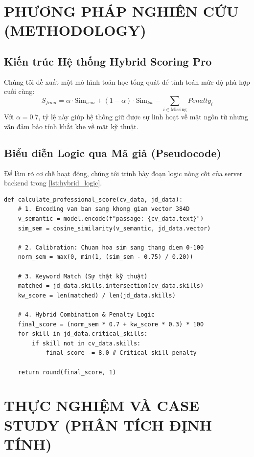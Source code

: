 \documentclass[12pt,a4paper,oneside]{report}
\begin{document}
\chapter{PHƯƠNG PHÁP NGHIÊN CỨU (METHODOLOGY)}
\label{ch:methods}

\section{Kiến trúc Hệ thống Hybrid Scoring Pro}
Chúng tôi đề xuất một mô hình toán học tổng quát để tính toán mức độ phù hợp cuối cùng:
\begin{equation}
    S_{final} = \alpha \cdot \text{Sim}_{sem} + (1-\alpha) \cdot \text{Sim}_{kw} - \sum_{i \in \text{Missing}} Penalty_i
\end{equation}
Với $\alpha=0.7$, tỷ lệ này giúp hệ thống giữ được sự linh hoạt về mặt ngôn từ nhưng vẫn đảm bảo tính khắt khe về mặt kỹ thuật.

\section{Biểu diễn Logic qua Mã giả (Pseudocode)}
Để làm rõ cơ chế hoạt động, chúng tôi trình bày đoạn logic nòng cốt của server backend trong \cref{lst:hybrid_logic}.

\begin{lstlisting}[caption={Thuật toán Hybrid Scoring thực thi trong MatchAI Pro}, label={lst:hybrid_logic}]
def calculate_professional_score(cv_data, jd_data):
    # 1. Encoding van ban sang khong gian vector 384D
    v_semantic = model.encode(f"passage: {cv_data.text}")
    sim_sem = cosine_similarity(v_semantic, jd_data.vector)
    
    # 2. Calibration: Chuan hoa sim sang thang diem 0-100
    norm_sem = max(0, min(1, (sim_sem - 0.75) / 0.20))
    
    # 3. Keyword Match (Sự thật kỹ thuật)
    matched = jd_data.skills.intersection(cv_data.skills)
    kw_score = len(matched) / len(jd_data.skills)
    
    # 4. Hybrid Combination & Penalty Logic
    final_score = (norm_sem * 0.7 + kw_score * 0.3) * 100
    for skill in jd_data.critical_skills:
        if skill not in cv_data.skills:
            final_score -= 8.0 # Critical skill penalty
            
    return round(final_score, 1)
\end{lstlisting}

\chapter{THỰC NGHIỆM VÀ CASE STUDY (PHÂN TÍCH ĐỊNH TÍNH)}
\label{ch:experiments}
\end{document}
